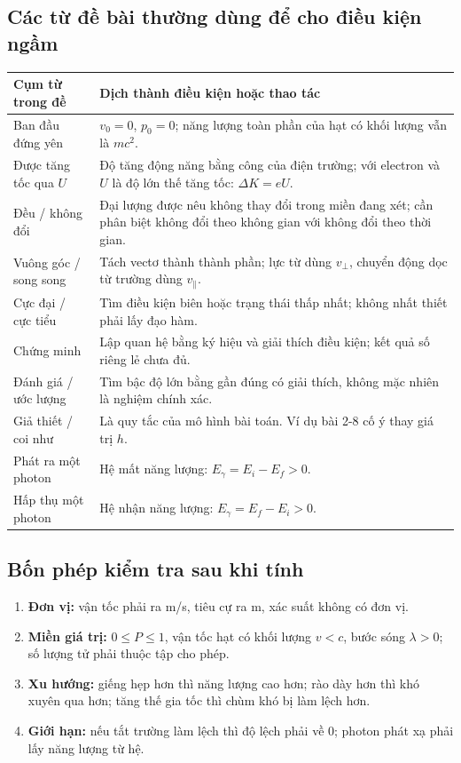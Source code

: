 \documentclass[11pt,a4paper]{article}
\begin{document}
\subsection{Các từ đề bài thường dùng để cho điều kiện ngầm}
\begin{tabularx}{\textwidth}{@{}Q{3.6cm}Y@{}}
\toprule
\textbf{Cụm từ trong đề} & \textbf{Dịch thành điều kiện hoặc thao tác}\\\midrule
Ban đầu đứng yên & $v_0=0$, $p_0=0$; năng lượng toàn phần của hạt có khối lượng vẫn là $mc^2$.\\
Được tăng tốc qua $U$ & Độ tăng động năng bằng công của điện trường; với electron và $U$ là độ lớn thế tăng tốc: $\Delta K=eU$.\\
Đều / không đổi & Đại lượng được nêu không thay đổi trong miền đang xét; cần phân biệt không đổi theo không gian với không đổi theo thời gian.\\
Vuông góc / song song & Tách vectơ thành thành phần; lực từ dùng $v_\perp$, chuyển động dọc từ trường dùng $v_\parallel$.\\
Cực đại / cực tiểu & Tìm điều kiện biên hoặc trạng thái thấp nhất; không nhất thiết phải lấy đạo hàm.\\
Chứng minh & Lập quan hệ bằng ký hiệu và giải thích điều kiện; kết quả số riêng lẻ chưa đủ.\\
Đánh giá / ước lượng & Tìm bậc độ lớn bằng gần đúng có giải thích, không mặc nhiên là nghiệm chính xác.\\
Giả thiết / coi như & Là quy tắc của mô hình bài toán. Ví dụ bài 2-8 cố ý thay giá trị $h$.\\
Phát ra một photon & Hệ mất năng lượng: $E_\gamma=E_i-E_f>0$.\\
Hấp thụ một photon & Hệ nhận năng lượng: $E_\gamma=E_f-E_i>0$.\\
\bottomrule
\end{tabularx}

\subsection{Bốn phép kiểm tra sau khi tính}
\begin{enumerate}
\item \textbf{Đơn vị:} vận tốc phải ra m/s, tiêu cự ra m, xác suất không có đơn vị.
\item \textbf{Miền giá trị:} $0\le P\le1$, vận tốc hạt có khối lượng $v<c$,
bước sóng $\lambda>0$; số lượng tử phải thuộc tập cho phép.
\item \textbf{Xu hướng:} giếng hẹp hơn thì năng lượng cao hơn; rào dày hơn
thì khó xuyên qua hơn; tăng thế gia tốc thì chùm khó bị làm lệch hơn.
\item \textbf{Giới hạn:} nếu tắt trường làm lệch thì độ lệch phải về 0;
photon phát xạ phải lấy năng lượng từ hệ.
\end{enumerate}
\end{document}
